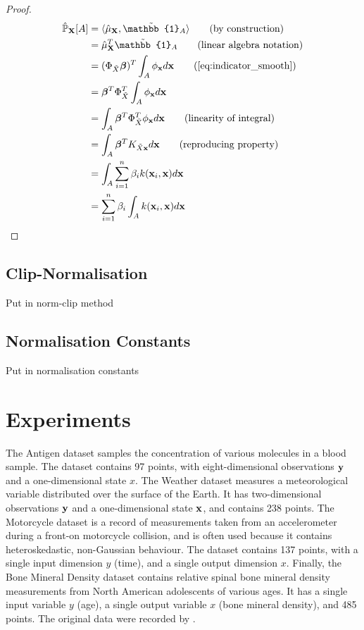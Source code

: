 \documentclass[twoside]{article} \usepackage{aistats2017}
\theoremstyle{definition}
\theoremstyle{theorem}
\newcommand{\rv}[1]{{#1}}
\newcommand{\ds}[1]{\tilde{#1}}
\newcommand{\warn}[1]{{\color{red} #1}}
\newcommand{\inner}[2]{{\langle #1, #2 \rangle}}
\begin{document}
		\begin{proof}
			\begin{align*}
					\hat{\mathbb{P}}_{\bvec{\rv{X}}}[A] &= \inner{\hat{\mu}_{\bvec{\rv{X}}}}{\tilde{\mathbb{1}}_{A}} \tag{by construction} \\
					&= \hat{\mu}_{\bvec{\rv{X}}}^{T} \tilde{\mathbb{1}}_{A} \tag{linear algebra notation} \\
					&= (\Phi_{\ds{X}} \bm{\beta})^{T} \int_{A} \phi_{\bvec{x}} d\bvec{x} \tag{\cref{eq:indicator_smooth}} \\
					&= \bm{\beta}^{T} \Phi_{\ds{X}}^{T} \int_{A} \phi_{\bvec{x}} d\bvec{x} \\
					&= \int_{A} \bm{\beta}^{T} \Phi_{\ds{X}}^{T} \phi_{\bvec{x}} d\bvec{x} \tag{linearity of integral} \\
					&= \int_{A} \bm{\beta}^{T} K_{\ds{X} \bvec{x}} d\bvec{x} \tag{reproducing property} \\
					&= \int_{A} \sum_{i = 1}^{n} \beta_{i} k(\bvec{x}_{i}, \bvec{x}) d\bvec{x} \\
					&= \sum_{i = 1}^{n} \beta_{i} \int_{A}  k(\bvec{x}_{i}, \bvec{x}) d\bvec{x} \\
			\end{align*}
		\end{proof}
		
	\subsection{Clip-Normalisation}
	
		\warn{Put in norm-clip method}
	
	\subsection{Normalisation Constants}
	
		\warn{Put in normalisation constants}
			
\section{Experiments}
\label{sec:experiments}

	The Antigen dataset samples the concentration of various molecules \citep{quadrianto2009kernel} in a blood sample. The dataset contains 97 points, with eight-dimensional observations $\mathbf{y}$ and a one-dimensional state $x$. The Weather dataset measures a meteorological variable distributed over the surface of the Earth. It has two-dimensional observations $\mathbf{y}$ and a one-dimensional state $\mathbf{x}$, and contains 238 points. The Motorcycle dataset is a record of measurements taken from an accelerometer during a front-on motorcycle collision, and is often used because it contains heteroskedastic, non-Gaussian behaviour. The dataset contains 137 points, with a single input dimension $y$ (time), and a single output dimension $x$. Finally, the Bone Mineral Density dataset contains relative spinal bone mineral density measurements from North American adolescents of various ages. It has a single input variable $y$ (age), a single output variable $x$ (bone mineral density), and 485 points. The original data were recorded by \cite{bachrach1999bone}.
\end{document}

